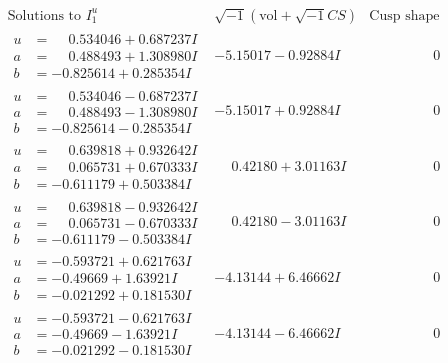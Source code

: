 \documentclass[1p]{elsarticle_modified}
\theoremstyle{definition}
\newcommand{\I}{\sqrt{-1}}
\begin{document}
$$\begin{array}{c|c|c}
 \end{array}$$\newpage$$\begin{array}{c|c|c}  
\text{Solutions to }I^u_{1}& \I (\text{vol} + \sqrt{-1}CS) & \text{Cusp shape}\\
 \hline 
\begin{aligned}
u &= \phantom{-}0.534046 + 0.687237 I \\
a &= \phantom{-}0.488493 + 1.308980 I \\
b &= -0.825614 + 0.285354 I\end{aligned}
 & -5.15017 - 0.92884 I & \phantom{-0.000000 } 0 \\ \hline\begin{aligned}
u &= \phantom{-}0.534046 - 0.687237 I \\
a &= \phantom{-}0.488493 - 1.308980 I \\
b &= -0.825614 - 0.285354 I\end{aligned}
 & -5.15017 + 0.92884 I & \phantom{-0.000000 } 0 \\ \hline\begin{aligned}
u &= \phantom{-}0.639818 + 0.932642 I \\
a &= \phantom{-}0.065731 + 0.670333 I \\
b &= -0.611179 + 0.503384 I\end{aligned}
 & \phantom{-}0.42180 + 3.01163 I & \phantom{-0.000000 } 0 \\ \hline\begin{aligned}
u &= \phantom{-}0.639818 - 0.932642 I \\
a &= \phantom{-}0.065731 - 0.670333 I \\
b &= -0.611179 - 0.503384 I\end{aligned}
 & \phantom{-}0.42180 - 3.01163 I & \phantom{-0.000000 } 0 \\ \hline\begin{aligned}
u &= -0.593721 + 0.621763 I \\
a &= -0.49669 + 1.63921 I \\
b &= -0.021292 + 0.181530 I\end{aligned}
 & -4.13144 + 6.46662 I & \phantom{-0.000000 } 0 \\ \hline\begin{aligned}
u &= -0.593721 - 0.621763 I \\
a &= -0.49669 - 1.63921 I \\
b &= -0.021292 - 0.181530 I\end{aligned}
 & -4.13144 - 6.46662 I & \phantom{-0.000000 } 0 \\ \hline\begin{aligned}

\end{aligned}
\end{array}$$
\end{document}
